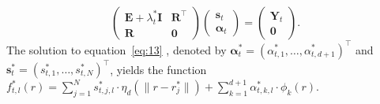 \documentclass[12pt]{article}
\newcommand{\T}{\intercal}
\theoremstyle{definition}
\begin{document}
\begin{equation}
  \left(
    \begin{array}{cc}
      \mathbf{E} + \lambda_t^* \mathbf{I} & \mathbf{R}^\T \\
      \mathbf{R} & \mathbf{0}
    \end{array}
  \right)\left(
    \begin{array}{c}
      \mathbf{s}_t \\
      \mathbf{\alpha}_t
    \end{array}
  \right) = \left(
    \begin{array}{c}
      \mathbf{Y}_t \\
      \mathbf{0}
    \end{array}
  \right). \label{eq:13}
\end{equation}
The solution to equation~\eqref{eq:13} , denoted by $\mathbf{\alpha}^*_t=(\alpha^*_{t,1},\ldots,\alpha^*_{t,d+1})^\T$ and $\mathbf{s}^*_t=(s^*_{t,1},\ldots,s^*_{t,N})^\T$, yields the function
$f_{t, l}^*(r) = \sum_{j=1}^{N}s_{t, j, l}^* \cdot  \eta_{d}\left(\|r - r_j^*\|\right) + \sum_{k=1}^{d + 1}\alpha_{t, k, l}^* \cdot \phi_k(r).$
\end{document}
